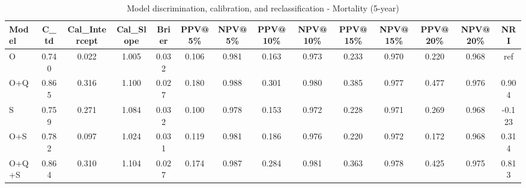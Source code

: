 \begin{table}[htbp]
\centering
\small
\caption{Model discrimination, calibration, and reclassification - Mortality (5-year)}
\label{tab:perf_mortality_5y}
\begin{tabular}{lccccccccccccc}
\toprule
Model & C\_td & Cal\_Intercept & Cal\_Slope & Brier & PPV@5\% & NPV@5\% & PPV@10\% & NPV@10\% & PPV@15\% & NPV@15\% & PPV@20\% & NPV@20\% & NRI \\
\midrule
O & 0.740 & 0.022 & 1.005 & 0.032 & 0.106 & 0.981 & 0.163 & 0.973 & 0.233 & 0.970 & 0.220 & 0.968 & ref \\
O+Q & 0.865 & 0.316 & 1.100 & 0.027 & 0.180 & 0.988 & 0.301 & 0.980 & 0.385 & 0.977 & 0.477 & 0.976 & 0.904 \\
S & 0.759 & 0.271 & 1.084 & 0.032 & 0.100 & 0.978 & 0.153 & 0.972 & 0.228 & 0.971 & 0.269 & 0.968 & -0.123 \\
O+S & 0.782 & 0.097 & 1.024 & 0.031 & 0.119 & 0.981 & 0.186 & 0.976 & 0.220 & 0.972 & 0.172 & 0.968 & 0.314 \\
O+Q+S & 0.864 & 0.310 & 1.104 & 0.027 & 0.174 & 0.987 & 0.284 & 0.981 & 0.363 & 0.978 & 0.425 & 0.975 & 0.813 \\
\bottomrule
\end{tabular}
\end{table}